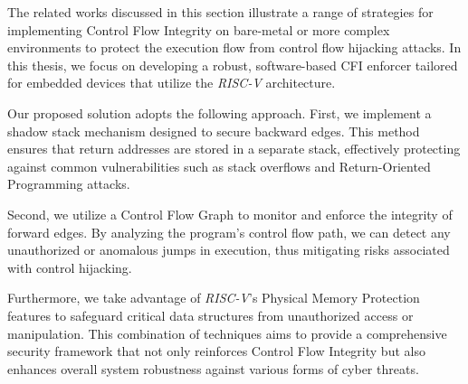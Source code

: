 The related works discussed in this section illustrate a range of strategies for
implementing Control Flow Integrity on bare-metal or more complex environments to
protect the execution flow from control flow hijacking attacks. In this thesis, we
focus on developing a robust, software-based CFI enforcer tailored for embedded
devices that utilize the \textit{RISC-V} architecture.

Our proposed solution adopts the following approach. First, we implement a shadow
stack mechanism designed to secure backward edges. This method ensures that
return addresses are stored in a separate stack, effectively protecting against common
vulnerabilities such as stack overflows and Return-Oriented Programming attacks.

Second, we utilize a Control Flow Graph to monitor and enforce the integrity of
forward edges. By analyzing the program's control flow path, we can detect any
unauthorized or anomalous jumps in execution, thus mitigating risks associated with
control hijacking.

Furthermore, we take advantage of \textit{RISC-V}'s Physical Memory Protection features
to safeguard critical data structures from unauthorized access or manipulation.
This combination of techniques aims to provide a comprehensive security
framework that not only reinforces Control Flow Integrity but also enhances
overall system robustness against various forms of cyber threats.
